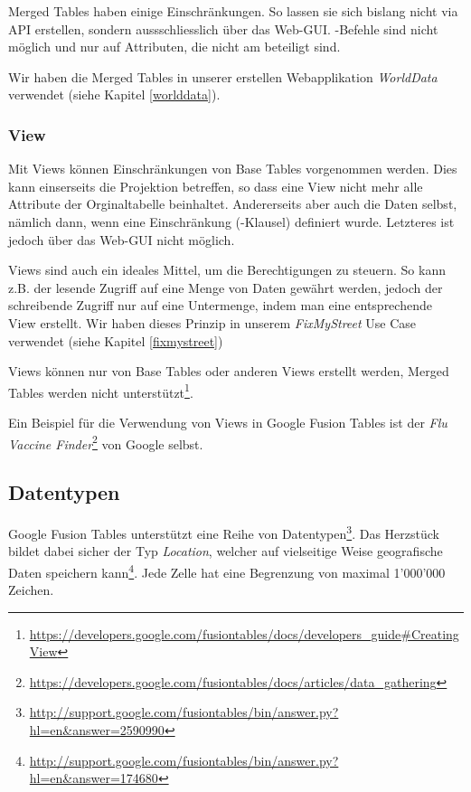 Merged Tables haben einige Einschränkungen. So lassen sie sich bislang nicht via \gls{API} erstellen, sondern aussschliesslich über das Web-GUI. -Befehle sind nicht möglich und  nur auf Attributen, die nicht am  beteiligt sind.

Wir haben die Merged Tables in unserer erstellen Webapplikation \emph{WorldData} verwendet (siehe Kapitel \ref{worlddata}).

\subsubsection{View}
Mit Views können Einschränkungen von Base Tables vorgenommen werden. Dies kann einserseits die Projektion betreffen, so dass eine View nicht mehr alle Attribute der Orginaltabelle beinhaltet. Andererseits aber auch die Daten selbst, nämlich dann, wenn eine Einschränkung (-Klausel) definiert wurde. Letzteres ist jedoch über das Web-GUI nicht möglich.

Views sind auch ein ideales Mittel, um die Berechtigungen zu steuern. So kann z.B. der lesende Zugriff auf eine Menge von Daten gewährt werden, jedoch der schreibende Zugriff nur auf eine Untermenge, indem man eine entsprechende View erstellt. Wir haben dieses Prinzip in unserem \emph{FixMyStreet} Use Case verwendet (siehe Kapitel \ref{fixmystreet})

Views können nur von Base Tables oder anderen Views erstellt werden, Merged Tables werden nicht unterstützt\footnote{\url{https://developers.google.com/fusiontables/docs/developers_guide\#CreatingView}}.

Ein Beispiel für die Verwendung von Views in Google Fusion Tables ist der \emph{Flu Vaccine Finder}\footnote{\url{https://developers.google.com/fusiontables/docs/articles/data_gathering}} von Google selbst.

\subsection{Datentypen}
Google Fusion Tables unterstützt eine Reihe von Datentypen\footnote{\url{http://support.google.com/fusiontables/bin/answer.py?hl=en&answer=2590990}}. Das Herzstück bildet dabei sicher der Typ \emph{Location}, welcher auf vielseitige Weise geografische Daten speichern kann\footnote{\url{http://support.google.com/fusiontables/bin/answer.py?hl=en&answer=174680}}. Jede Zelle hat eine Begrenzung von maximal 1'000'000 Zeichen.

